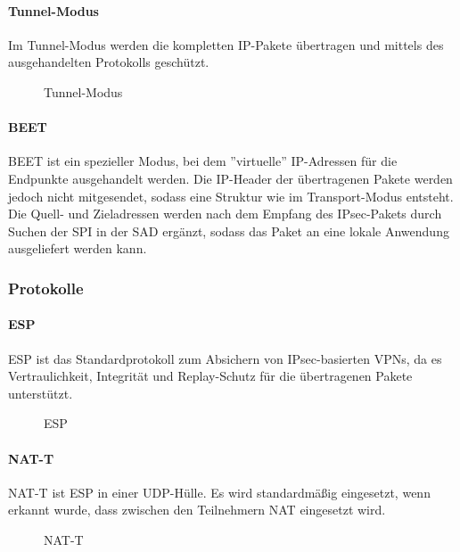 \paragraph{Tunnel-Modus}
Im Tunnel-Modus werden die kompletten \ac{IP}-Pakete übertragen und mittels des ausgehandelten
Protokolls geschützt.

\begin{figure}
    \caption{Tunnel-Modus}
    \label{fig:Tunnel-Modus}
    \centering
    \def\svgwidth{\columnwidth}
    
\end{figure}

\paragraph{BEET}
\ac{BEET} ist ein spezieller Modus, bei dem ''virtuelle'' \ac{IP}-Adressen für die Endpunkte
ausgehandelt werden. Die \ac{IP}-Header der übertragenen Pakete werden jedoch nicht mitgesendet,
sodass eine Struktur wie im Transport-Modus entsteht. Die Quell- und Zieladressen
werden nach dem Empfang des \ac{IPsec}-Pakets durch Suchen der \ac{SPI} in der \ac{SAD}
ergänzt, sodass das Paket an eine lokale Anwendung ausgeliefert werden kann.

\subsubsection{Protokolle}

\paragraph{ESP}
\ac{ESP} ist das Standardprotokoll zum Absichern von \ac{IPsec}-basierten \acp{VPN},
da es Vertraulichkeit, Integrität und Replay-Schutz für die übertragenen Pakete unterstützt.
\begin{figure}
    \label{fig:ESP}
    \centering
    \def\svgwidth{\columnwidth}
    
    \caption{\ac{ESP}}
\end{figure}

\paragraph{NAT-T}
\ac{NAT-T} ist \ac{ESP} in einer UDP-Hülle. Es wird standardmäßig eingesetzt, wenn
erkannt wurde, dass zwischen den Teilnehmern NAT eingesetzt wird.
\begin{figure}
    \label{fig:NAT-T}
    \centering
    \def\svgwidth{\columnwidth}
    
    \caption{\ac{NAT-T}}
\end{figure}

